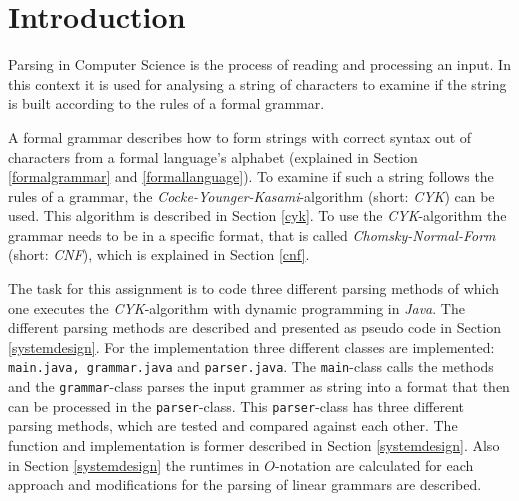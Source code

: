 \documentclass[a4paper, 11pt]{article}
\begin{document}

\begin{spacing}{1}


\newpage
\fancyhead[LO]{\empty}
{
  \hypersetup{linkcolor=black}
  \tableofcontents
}

\end{spacing}

\newpage















\section{Introduction}

Parsing in Computer Science is the process  of reading and processing an input. In this context it is used for analysing a string of characters to examine if the string is built according to the rules of a formal grammar. 

A formal grammar describes how to form strings with correct syntax out of characters from a formal language's alphabet (explained in Section \ref{formalgrammar} and \ref{formallanguage}).
To examine if such a string follows the rules of a grammar, the \textit{Cocke-Younger-Kasami}-algorithm (short: \textit{CYK}) can be used. This algorithm is described in Section \ref{cyk}. To use the \textit{CYK}-algorithm the grammar needs to be in a specific format, that is called \textit{Chomsky-Normal-Form} (short: \textit{CNF}), which is explained in Section \ref{cnf}. \cite{CYK_name, CYK1}


The task for this assignment is to code three different parsing methods of which one executes the \textit{CYK}-algorithm with dynamic programming in \textit{Java}. The different parsing methods are described and presented as pseudo code in Section \ref{systemdesign}.
For the implementation three different classes are implemented: \texttt{main.java, grammar.java} and \texttt{parser.java}. The \texttt{main}-class calls the methods and the \texttt{grammar}-class parses the input grammer as string into a format that then can be processed in the \texttt{parser}-class. This \texttt{parser}-class has three different parsing methods, which are tested and compared against each other.
The function and implementation is former described in Section \ref{systemdesign}. Also in Section \ref{systemdesign} the runtimes in $O$-notation are calculated for each approach and modifications for the parsing of linear grammars are described.
\end{document}
